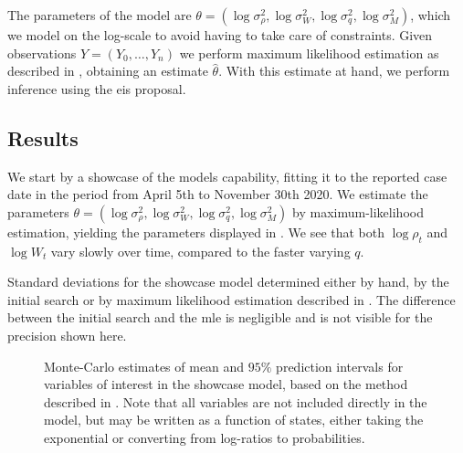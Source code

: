 The parameters of the model are $\theta = \left( \log \sigma^{2}_{\rho}, \log \sigma^{2}_{W}, \log \sigma^{2}_{q}, \log \sigma^{2}_M\right)$, which we model on the log-scale to avoid having to take care of constraints. Given observations $Y = (Y_{0}, \dots, Y_{n})$ we perform maximum likelihood estimation as described in , obtaining an estimate $\hat\theta$.
With this estimate at hand, we perform inference using the \acrshort{eis} proposal. 
%

\subsection{Results}
We start by a showcase of the models capability, fitting it to the reported case date in the period from April 5th to November 30th 2020. We estimate the parameters $\theta = \left( \log \sigma^{2}_{\rho}, \log \sigma^{2}_W, \log \sigma^{2}_q, \log \sigma^{2}_M\right)$ by maximum-likelihood estimation, yielding the parameters displayed in . We see that both $\log \rho_{t}$ and $\log W_{t}$ vary slowly over time, compared to the faster varying $q$. 

\begin{table}
    \centering
    
    \label{tab:showcase-parameters}
    \caption{Standard deviations for the showcase model determined either by hand, by the initial search or by maximum likelihood estimation described in . The difference between the initial search and the \acrshort{mle} is negligible and is not visible for the precision shown here.}
\end{table}

\begin{figure}
    \resizebox{\textwidth}{!}{%
    }
    \caption{Monte-Carlo estimates of mean and $95\%$ prediction intervals for variables of interest in the showcase model, based on the method described in . Note that all variables are not included directly in the model, but may be written as a function of states, either taking the exponential or converting from log-ratios to probabilities. }
    \label{fig:showcase_prediction_intervals}
\end{figure}

